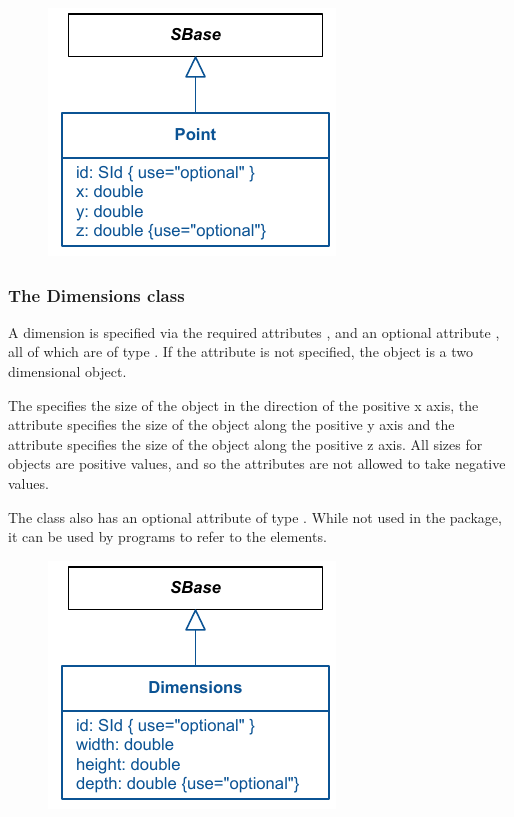\begin{figure}[!h]
\includegraphics{uml/layout-point-uml}\\
\label{uml:point}
\end{figure}

\subsubsection{The Dimensions class} \label{dimensions-class} A 
dimension is specified via the required attributes , 
 and an optional attribute , all of which are 
of type . If the attribute  is not 
specified, the object is a two dimensional object. 

The  specifies the size of the object in the direction of 
the positive x axis, the  attribute specifies the size of 
the object along the positive y axis and the  attribute 
specifies the size of the object along the positive z axis. All sizes 
for \Dimensions objects are positive values, and so the attributes are not allowed to take negative values. 

The \Dimensions class also has an optional attribute  of type 
. While not used in the \Layout package, it can be used by programs to refer to the elements. 


\begin{figure}[!h]
\includegraphics{uml/layout-dimensions-uml}\\
\label{uml:dimensions}
\end{figure}
